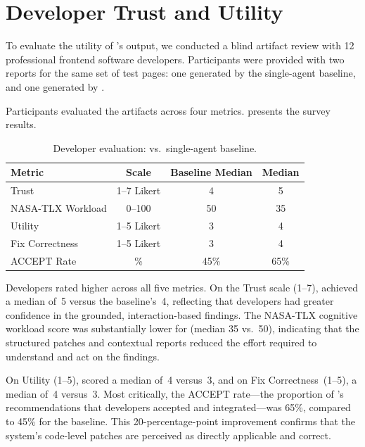 \section{Developer Trust and Utility}
\label{sec:rq4-results}

To evaluate the utility of \versimux{}'s output, we conducted a blind artifact review with 12 professional frontend software developers. Participants were provided with two reports for the same set of test pages: one generated by the single-agent baseline, and one generated by \versimux{}.

Participants evaluated the artifacts across four metrics.  presents the survey results.

\begin{table}[htbp]
  \centering
  \caption{Developer evaluation: \versimux{} vs.\ single-agent baseline.}
  \label{tab:developer-survey}
  \begin{tabularx}{\textwidth}{@{}L{3.5cm} c c c@{}}
    \toprule
    \textbf{Metric} & \textbf{Scale} & \textbf{Baseline Median} & \textbf{\versimux{} Median} \\
    \midrule
    Trust                & 1--7 Likert  & 4          & 5 \\
    NASA-TLX Workload    & 0--100       & 50         & 35 \\
    Utility              & 1--5 Likert  & 3          & 4 \\
    Fix Correctness      & 1--5 Likert  & 3          & 4 \\
    ACCEPT Rate          & \%           & 45\%       & 65\% \\
    \bottomrule
  \end{tabularx}
\end{table}

Developers rated \versimux{} higher across all five metrics. On the Trust scale (1--7), \versimux{} achieved a median of~5 versus the baseline's~4, reflecting that developers had greater confidence in the grounded, interaction-based findings. The NASA-TLX cognitive workload score was substantially lower for \versimux{} (median 35 vs.\ 50), indicating that the structured patches and contextual reports reduced the effort required to understand and act on the findings.

On Utility (1--5), \versimux{} scored a median of~4 versus~3, and on Fix Correctness~(1--5), a median of~4 versus~3. Most critically, the ACCEPT rate---the proportion of \versimux{}'s recommendations that developers accepted and integrated---was 65\%, compared to 45\% for the baseline. This 20-percentage-point improvement confirms that the system's code-level patches are perceived as directly applicable and correct.

